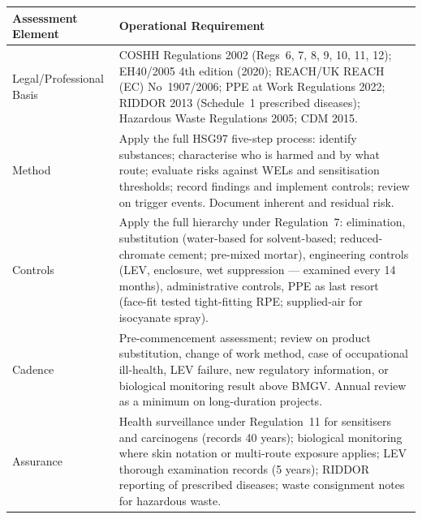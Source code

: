 \begin{table}[H]
\centering
\begin{tabularx}{\textwidth}{>{\raggedright\arraybackslash}p{3.2cm}X}
\toprule
\textbf{Assessment Element} & \textbf{Operational Requirement} \\
\midrule
Legal/Professional Basis & COSHH Regulations 2002 (Regs~6, 7, 8, 9, 10, 11, 12); EH40/2005 4th edition (2020); REACH/UK REACH (EC) No~1907/2006; PPE at Work Regulations 2022; RIDDOR 2013 (Schedule~1 prescribed diseases); Hazardous Waste Regulations 2005; CDM 2015. \\
Method & Apply the full HSG97 five-step process: identify substances; characterise who is harmed and by what route; evaluate risks against WELs and sensitisation thresholds; record findings and implement controls; review on trigger events. Document inherent and residual risk. \\
Controls & Apply the full hierarchy under Regulation~7: elimination, substitution (water-based for solvent-based; reduced-chromate cement; pre-mixed mortar), engineering controls (LEV, enclosure, wet suppression — examined every 14 months), administrative controls, PPE as last resort (face-fit tested tight-fitting RPE; supplied-air for isocyanate spray). \\
Cadence & Pre-commencement assessment; review on product substitution, change of work method, case of occupational ill-health, LEV failure, new regulatory information, or biological monitoring result above BMGV. Annual review as a minimum on long-duration projects. \\
Assurance & Health surveillance under Regulation~11 for sensitisers and carcinogens (records 40 years); biological monitoring where skin notation or multi-route exposure applies; LEV thorough examination records (5 years); RIDDOR reporting of prescribed diseases; waste consignment notes for hazardous waste. \\
\bottomrule
\end{tabularx}
\end{table}

